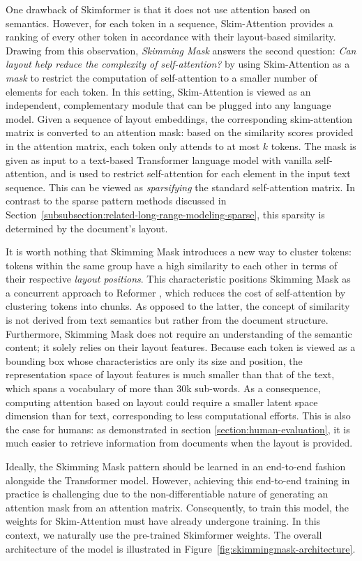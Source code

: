 One drawback of Skimformer is that it does not use attention based on semantics. However, for each token in a sequence, Skim-Attention provides a ranking of every other token in accordance with their layout-based similarity. Drawing from this observation, \emph{Skimming Mask} answers the second question: \textit{Can layout help reduce the complexity of self-attention?} by using Skim-Attention as a \textit{mask} to restrict the computation of self-attention to a smaller number of elements for each token. In this setting, Skim-Attention is viewed as an independent, complementary module that can be plugged into any language model. Given a sequence of layout embeddings, the corresponding skim-attention matrix is converted to an attention mask: based on the similarity scores provided in the attention matrix, each token only attends to at most $k$ tokens. The mask is given as input to a text-based Transformer language model with vanilla self-attention, and is used to restrict self-attention for each element in the input text sequence. This can be viewed as \emph{sparsifying} the standard self-attention matrix. In contrast to the sparse pattern methods discussed in Section~\ref{subsubsection:related-long-range-modeling-sparse}, this sparsity is determined by the document's layout.

It is worth nothing that Skimming Mask introduces a new way to cluster tokens: tokens within the same group have a high similarity to each other in terms of their respective \emph{layout positions}. This characteristic positions Skimming Mask as a concurrent approach to Reformer \citep{kitaev2020reformer}, which reduces the cost of self-attention by clustering tokens into chunks. As opposed to the latter, the concept of similarity is not derived from text semantics but rather from the document structure. Furthermore, Skimming Mask does not require an understanding of the semantic content; it solely relies on their layout features. Because each token is viewed as a bounding box whose characteristics are only its size and position, the representation space of layout features is much smaller than that of the text, which spans a vocabulary of more than 30k sub-words. As a consequence, computing attention based on layout could require a smaller latent space dimension than for text, corresponding to less computational efforts. This is also the case for humans: as demonstrated in section \ref{section:human-evaluation}, it is much easier to retrieve information from documents when the layout is provided.

Ideally, the Skimming Mask pattern should be learned in an end-to-end fashion alongside the Transformer model. However, achieving this end-to-end training in practice is challenging due to the non-differentiable nature of generating an attention mask from an attention matrix. Consequently, to train this model, the weights for Skim-Attention must have already undergone training. In this context, we naturally use the pre-trained Skimformer weights. The overall architecture of the model is illustrated in Figure~\ref{fig:skimmingmask-architecture}.

